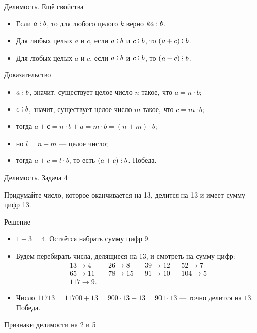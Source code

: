 \documentclass[17pt]{extarticle}
\newcommand{\divsby}{\mathrel{\rlap{.}\rlap{\raisebox{0.55ex}{.}}\raisebox{1.1ex}{.}}}
\newcommand{\newslide}[1]{\newpage \begin{center} \large #1 \end{center}}
\begin{document}
\newslide{Делимость. Ещё свойства}
\begin{itemize}
\item Если $a \divsby b$, то для любого целого $k$ верно $ka \divsby b$.
\item Для любых целых $a$ и $c$, если $a \divsby b$ и $c \divsby b$, то $(a + c) \divsby b$.
\item Для любых целых $a$ и $c$, если $a \divsby b$ и $c \divsby b$, то $(a - c) \divsby b$.
\end{itemize}

\newslide{Доказательство}\vspace{-7mm}

\begin{itemize}\itemsep=0mm
\item  $a \divsby b$, значит, существует целое число $n$ такое, что $a = n\cdot b$;
\item  $c \divsby b$, значит, существует целое число $m$ такое, что $c = m\cdot b$;
\item тогда $a+с = n\cdot b + a = m\cdot b = (n+m)\cdot b$;
\item но $l =n+m$ --- целое число;
\item тогда $a+c = l\cdot b$, то есть $(a+c) \divsby b$. Победа.
\end{itemize}

\newslide{Делимость. Задача 4}

Придумайте число, которое оканчивается на 13, делится на 13 и имеет сумму цифр 13.

\newslide{Решение}\vspace{-10mm}

\begin{itemize}\itemsep=-1mm
\item $1+3 = 4$. Остаётся набрать сумму цифр 9.
\item Будем перебирать числа, делящиеся на 13, и смотреть на сумму цифр:\vspace{-1mm}
\begin{align*}
13 \to 4 && 26\to 8 && 39 \to 12 && 52 \to 7\\
65 \to 11 && 78 \to 15 && 91 \to 10 && 104 \to 5\\
117 \to 9.
\end{align*}\vspace{-9mm}
\item Число $11713 = 11700 + 13 = 900\cdot13 + 13 = 901\cdot13$ --- точно делится на $13$. Победа.
\end{itemize}

\newslide{Признаки делимости на 2 и 5}\vspace{-7mm}
\end{document}
